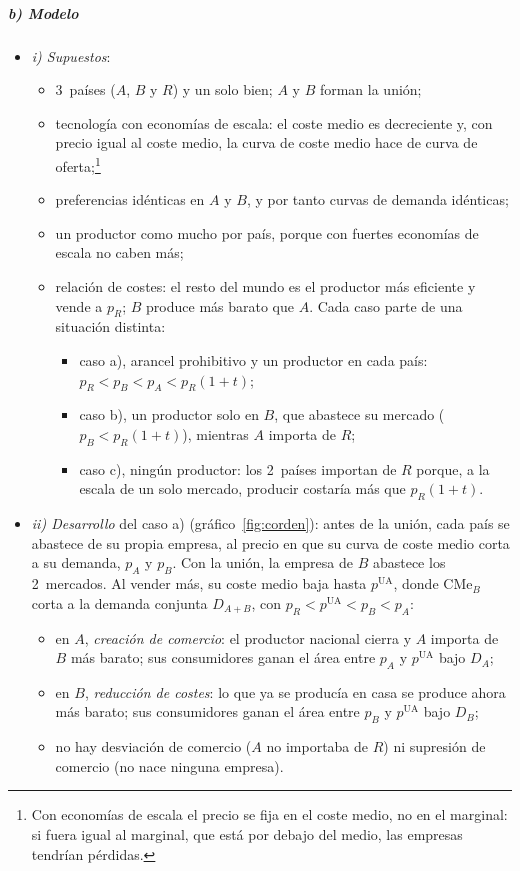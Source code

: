 \documentclass[11pt]{article}
\begin{document}
\subparagraph{b) Modelo}

\begin{itemize}
\item \emph{i) Supuestos}:
  \begin{itemize}
  \item 3~países ($A$, $B$ y $R$) y un solo bien; $A$ y $B$ forman la unión;
  \item tecnología con economías de escala: el coste medio es decreciente y, con precio igual al coste medio, la curva de coste medio hace de curva de oferta;\footnote{Con economías de escala el precio se fija en el coste medio, no en el marginal: si fuera igual al marginal, que está por debajo del medio, las empresas tendrían pérdidas.}
  \item preferencias idénticas en $A$ y $B$, y por tanto curvas de demanda idénticas;
  \item un productor como mucho por país, porque con fuertes economías de escala no caben más;
  \item relación de costes: el resto del mundo es el productor más eficiente y vende a $p_R$; $B$ produce más barato que $A$. Cada caso parte de una situación distinta:
    \begin{itemize}
    \item caso a), arancel prohibitivo y un productor en cada país: $p_R<p_B<p_A<p_R(1+t)$;
    \item caso b), un productor solo en $B$, que abastece su mercado ($p_B<p_R(1+t)$), mientras $A$ importa de $R$;
    \item caso c), ningún productor: los 2~países importan de $R$ porque, a la escala de un solo mercado, producir costaría más que $p_R(1+t)$.
    \end{itemize}
  \end{itemize}
\item \emph{ii) Desarrollo} del caso a) (gráfico~\ref{fig:corden}): antes de la unión, cada país se abastece de su propia empresa, al precio en que su curva de coste medio corta a su demanda, $p_A$ y $p_B$. Con la unión, la empresa de $B$ abastece los 2~mercados. Al vender más, su coste medio baja hasta $p^{\mathrm{UA}}$, donde $\mathrm{CMe}_B$ corta a la demanda conjunta $D_{A+B}$, con $p_R<p^{\mathrm{UA}}<p_B<p_A$:
  \begin{itemize}
  \item en $A$, \emph{creación de comercio}: el productor nacional cierra y $A$ importa de $B$ más barato; sus consumidores ganan el área entre $p_A$ y $p^{\mathrm{UA}}$ bajo $D_A$;
  \item en $B$, \emph{reducción de costes}: lo que ya se producía en casa se produce ahora más barato; sus consumidores ganan el área entre $p_B$ y $p^{\mathrm{UA}}$ bajo $D_B$;
  \item no hay desviación de comercio ($A$ no importaba de $R$) ni supresión de comercio (no nace ninguna empresa).
  \end{itemize}
\end{itemize}
\end{document}
